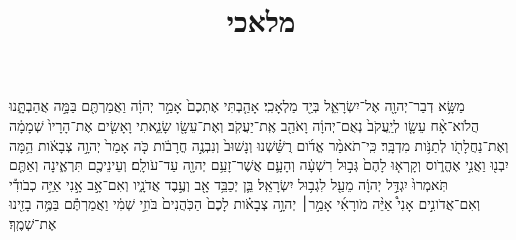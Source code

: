 \documentclass{openreader}
\title{מלאכי}
\date{}
\begin{document}
\maketitle
\raggedbottom 
\fontsize{16pt}{24pt}\selectfont


מַשָּׂ֥א דְבַר־יְהוָ֖ה אֶל־יִשְׂרָאֵ֑ל בְּיַ֖ד מַלְאָכִֽי׃ 
אָהַ֤בְתִּי אֶתְכֶם֙ אָמַ֣ר יְהוָ֔ה וַאֲמַרְתֶּ֖ם בַּמָּ֣ה אֲהַבְתָּ֑נוּ הֲלֹוא־אָ֨ח עֵשָׂ֤ו לְיַֽעֲקֹב֙ נְאֻם־יְהוָ֔ה וָאֹהַ֖ב אֶֽת־יַעֲקֹֽב׃ 
וְאֶת־עֵשָׂ֖ו שָׂנֵ֑אתִי וָאָשִׂ֤ים אֶת־הָרָיו֙ שְׁמָמָ֔ה וְאֶת־נַחֲלָתֹ֖ו לְתַנֹּ֥ות מִדְבָּֽר׃ 
כִּֽי־תֹאמַ֨ר אֱדֹ֜ום רֻשַּׁ֗שְׁנוּ וְנָשׁוּב֙ וְנִבְנֶ֣ה חֳרָבֹ֔ות כֹּ֤ה אָמַר֙ יְהוָ֣ה צְבָאֹ֔ות הֵ֥מָּה יִבְנ֖וּ וַאֲנִ֣י אֶהֱרֹ֑וס וְקָרְא֤וּ לָהֶם֙ גְּב֣וּל רִשְׁעָ֔ה וְהָעָ֛ם אֲשֶׁר־זָעַ֥ם יְהוָ֖ה עַד־עֹולָֽם׃ 
וְעֵינֵיכֶ֖ם תִּרְאֶ֑ינָה וְאַתֶּ֤ם תֹּֽאמְרוּ֙ יִגְדַּ֣ל יְהוָ֔ה מֵעַ֖ל לִגְב֥וּל יִשְׂרָאֵֽל׃ 
בֵּ֛ן יְכַבֵּ֥ד אָ֖ב וְעֶ֣בֶד אֲדֹנָ֑יו וְאִם־אָ֣ב אָ֣נִי אַיֵּ֣ה כְבֹודִ֡י וְאִם־אֲדֹונִ֣ים אָנִי֩ אַיֵּ֨ה מֹורָאִ֜י אָמַ֣ר׀ יְהוָ֣ה צְבָאֹ֗ות לָכֶם֙ הַכֹּֽהֲנִים֙ בֹּוזֵ֣י שְׁמִ֔י וַאֲמַרְתֶּ֕ם בַּמֶּ֥ה בָזִ֖ינוּ אֶת־שְׁמֶֽךָ׃ 
\end{document}
